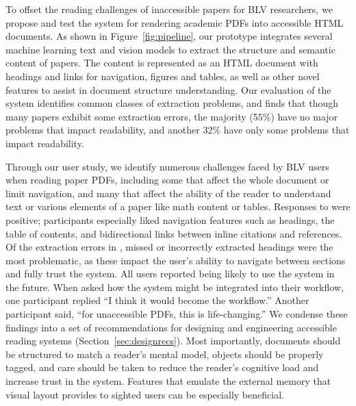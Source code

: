To offset the reading challenges of inaccessible papers for BLV researchers, we propose and test the \scially system for rendering academic PDFs into accessible HTML documents. As shown in Figure~\ref{fig:pipeline}, our prototype integrates several machine learning text and vision models to extract the structure and semantic content of papers. The content is represented as an HTML document with headings and links for navigation, figures and tables, as well as other novel features to assist in document structure understanding. Our evaluation of the \scially system identifies common classes of extraction problems, and finds that though many papers exhibit some extraction errors, the majority (55\%) have no major problems that impact readability, and another 32\% have only some problems that impact readability.

Through our user study, we identify numerous challenges faced by BLV users when reading paper PDFs, including some that affect the whole document or limit navigation, and many that affect the ability of the reader to understand text or various elements of a paper like math content or tables. Responses to \scially were positive; participants especially liked navigation features such as headings, the table of contents, and bidirectional links between inline citations and references. Of the extraction errors in \scially, missed or incorrectly extracted headings were the most problematic, as these impact the user's ability to navigate between sections and fully trust the system. All users reported being likely to use the system in the future. When asked how the system might be integrated into their workflow, one participant replied ``I think it would become the workflow.'' Another participant said, ``for unaccessible PDFs, this is life-changing.'' We condense these findings into a set of recommendations for designing and engineering accessible reading systems (Section~\ref{sec:designrecs}). Most importantly, documents should be structured to match a reader's mental model, objects should be properly tagged, and care should be taken to reduce the reader's cognitive load and increase trust in the system. Features that emulate the external memory that visual layout provides to sighted users can be especially beneficial.

